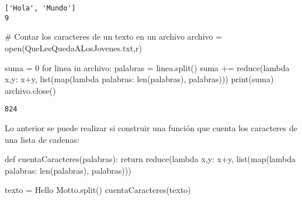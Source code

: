 \documentclass[
  letterpaper,
  DIV=11,
  numbers=noendperiod]{scrreprt}
\newenvironment{Shaded}{\begin{snugshade}}{\end{snugshade}}
\newcommand{\BuiltInTok}[1]{\textcolor[rgb]{0.00,0.23,0.31}{#1}}
\newcommand{\CommentTok}[1]{\textcolor[rgb]{0.37,0.37,0.37}{#1}}
\newcommand{\ControlFlowTok}[1]{\textcolor[rgb]{0.00,0.23,0.31}{#1}}
\newcommand{\DecValTok}[1]{\textcolor[rgb]{0.68,0.00,0.00}{#1}}
\newcommand{\KeywordTok}[1]{\textcolor[rgb]{0.00,0.23,0.31}{#1}}
\newcommand{\NormalTok}[1]{\textcolor[rgb]{0.00,0.23,0.31}{#1}}
\newcommand{\OperatorTok}[1]{\textcolor[rgb]{0.37,0.37,0.37}{#1}}
\newcommand{\StringTok}[1]{\textcolor[rgb]{0.13,0.47,0.30}{#1}}
\begin{document}
\begin{verbatim}
['Hola', 'Mundo']
9
\end{verbatim}

\begin{Shaded}
\begin{Highlighting}[]
\CommentTok{\# Contar los caracteres de un texto en un archivo}
\NormalTok{archivo }\OperatorTok{=} \BuiltInTok{open}\NormalTok{(}\StringTok{\textquotesingle{}QueLesQuedaALosJovenes.txt\textquotesingle{}}\NormalTok{,}\StringTok{\textquotesingle{}r\textquotesingle{}}\NormalTok{)}

\NormalTok{suma }\OperatorTok{=} \DecValTok{0}
\ControlFlowTok{for}\NormalTok{ linea }\KeywordTok{in}\NormalTok{ archivo:}
\NormalTok{    palabras }\OperatorTok{=}\NormalTok{ linea.split()}
\NormalTok{    suma }\OperatorTok{+=} \BuiltInTok{reduce}\NormalTok{(}\KeywordTok{lambda}\NormalTok{ x,y: x}\OperatorTok{+}\NormalTok{y, }\BuiltInTok{list}\NormalTok{(}\BuiltInTok{map}\NormalTok{(}\KeywordTok{lambda}\NormalTok{ palabras: }\BuiltInTok{len}\NormalTok{(palabras), palabras)))}
\BuiltInTok{print}\NormalTok{(suma)}
\NormalTok{archivo.close()}
\end{Highlighting}
\end{Shaded}

\begin{verbatim}
824
\end{verbatim}

Lo anterior se puede realizar si construir una función que cuenta los
caracteres de una lista de cadenas:

\begin{Shaded}
\begin{Highlighting}[]
\KeywordTok{def}\NormalTok{ cuentaCaracteres(palabras):}
    \ControlFlowTok{return} \BuiltInTok{reduce}\NormalTok{(}\KeywordTok{lambda}\NormalTok{ x,y: x}\OperatorTok{+}\NormalTok{y, }\BuiltInTok{list}\NormalTok{(}\BuiltInTok{map}\NormalTok{(}\KeywordTok{lambda}\NormalTok{ palabras: }\BuiltInTok{len}\NormalTok{(palabras), palabras)))}
\end{Highlighting}
\end{Shaded}

\begin{Shaded}
\begin{Highlighting}[]
\NormalTok{texto }\OperatorTok{=} \StringTok{\textquotesingle{}Hello Motto\textquotesingle{}}\NormalTok{.split()}
\NormalTok{cuentaCaracteres(texto)}
\end{Highlighting}
\end{Shaded}
\end{document}
